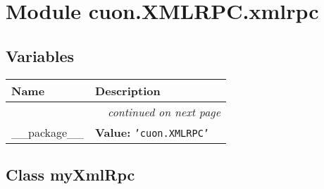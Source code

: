 %
%
%


\section{Module cuon.XMLRPC.xmlrpc}

    \label{cuon:XMLRPC:xmlrpc}


  \subsection{Variables}

    \vspace{-1cm}
\hspace{\varindent}\begin{longtable}{|p{\varnamewidth}|p{\vardescrwidth}|l}
\cline{1-2}
\cline{1-2} \centering \textbf{Name} & \centering \textbf{Description}& \\
\cline{1-2}
\endhead\cline{1-2}\multicolumn{3}{r}{\small\textit{continued on next page}}\\\endfoot\cline{1-2}
\endlastfoot\raggedright \_\-\_\-p\-a\-c\-k\-a\-g\-e\-\_\-\_\- & \raggedright \textbf{Value:} 
{\tt \texttt{'}\texttt{cuon.XMLRPC}\texttt{'}}&\\
\cline{1-2}
\end{longtable}



\subsection{Class myXmlRpc}

